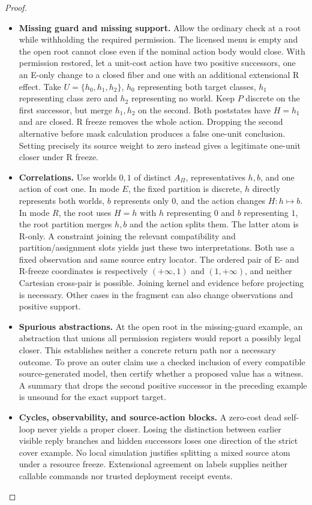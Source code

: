 \begin{proof}
\begin{itemize}
\item
  \textbf{Missing guard and missing support.} Allow the ordinary check at a root while withholding the required permission. The licensed menu is empty and the open root cannot close even if the nominal action body would close. With permission restored, let a unit-cost action have two positive successors, one an E-only change to a closed fiber and one with an additional extensional R effect. Take \(U=\{h_0,h_1,h_2\}\), \(h_0\) representing both target classes, \(h_1\) representing class zero and \(h_2\) representing no world. Keep \(P\) discrete on the first successor, but merge \(h_1,h_2\) on the second. Both poststates have \(H=h_1\) and are closed. R freeze removes the whole action. Dropping the second alternative before mask calculation produces a false one-unit conclusion. Setting precisely its source weight to zero instead gives a legitimate one-unit closer under R freeze.
\item
  \textbf{Correlations.} Use worlds \(0,1\) of distinct \(A_\Pi\), representatives \(h,b\), and one action of cost one. In mode \(E\), the fixed partition is discrete, \(h\) directly represents both worlds, \(b\) represents only \(0\), and the action changes \(H:h\mapsto b\). In mode \(R\), the root uses \(H=h\) with \(h\) representing \(0\) and \(b\) representing \(1\), the root partition merges \(h,b\) and the action splits them. The latter atom is R-only. A constraint joining the relevant compatibility and partition/assignment slots yields just these two interpretations. Both use a fixed observation and same source entry locator. The ordered pair of E- and R-freeze coordinates is respectively \((+\infty,1)\) and \((1,+\infty)\), and neither Cartesian cross-pair is possible. Joining kernel and evidence before projecting is necessary. Other cases in the fragment can also change observations and positive support.
\item
  \textbf{Spurious abstractions.} At the open root in the missing-guard example, an abstraction that unions all permission registers would report a possibly legal closer. This establishes neither a concrete return path nor a necessary outcome. To prove an outer claim use a checked inclusion of every compatible source-generated model, then certify whether a proposed value has a witness. A summary that drops the second positive successor in the preceding example is unsound for the exact support target.
\item
  \textbf{Cycles, observability, and source-action blocks.} A zero-cost dead self-loop never yields a proper closer. Losing the distinction between earlier visible reply branches and hidden successors loses one direction of the strict cover example. No local simulation justifies splitting a mixed source atom under a resource freeze. Extensional agreement on labels supplies neither callable commands nor trusted deployment receipt events.

\end{itemize}
\end{proof}
